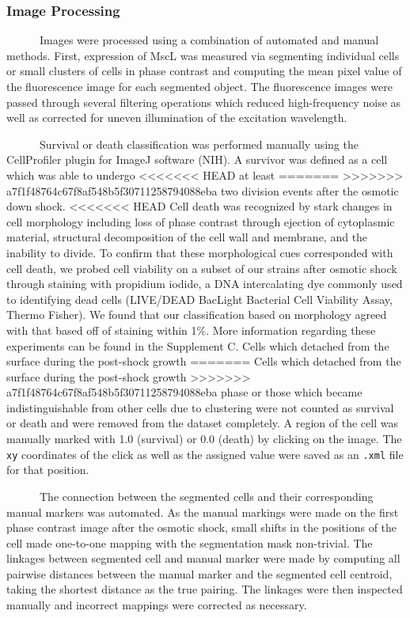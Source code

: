 \subsubsection{Image
Processing}\label{image-processing}

~ ~ ~
~Images
were
processed
using
a
combination
of
automated
and
manual
methods.
First,
expression
of
MscL
was
measured
via
segmenting
individual
cells
or
small
clusters
of
cells
in
phase
contrast
and
computing
the
mean
pixel
value
of the
fluorescence
image
for
each
segmented
object.
The
fluorescence
images
were
passed
through
several
filtering
operations
which
reduced
high-frequency
noise
as
well
as
corrected
for
uneven
illumination
of the
excitation
wavelength.

~ ~ ~
~Survival
or
death
classification
was
performed
manually
using
the
CellProfiler
plugin
for
ImageJ
software
(NIH).
A
survivor
was
defined
as a
cell
which
was
able
to
undergo
<<<<<<< HEAD
at
least
=======
>>>>>>> a7f1f48764c67f8af548b5f30711258794088eba
two
division
events
after
the
osmotic
down
shock.
<<<<<<< HEAD
Cell
death
was
recognized
by
stark
changes
in
cell
morphology
including
loss
of
phase
contrast
through
ejection
of
cytoplasmic
material,
structural
decomposition
of the
cell
wall
and
membrane,
and
the
inability
to
divide.
To
confirm
that
these
morphological
cues
corresponded
with
cell
death,
we
probed
cell
viability
on a
subset
of our
strains
after
osmotic
shock
through
staining
with
propidium
iodide,
a DNA
intercalating
dye
commonly
used
to
identifying
dead
cells
(LIVE/DEAD
BacLight
Bacterial
Cell
Viability
Assay,
Thermo
Fisher).
We
found
that
our
classification
based
on
morphology
agreed
with
that
based
off of
staining
within
1\%.
More
information
regarding
these
experiments
can be
found
in the
Supplement
C.
Cells
which
detached
from
the
surface
during
the
post-shock
growth
=======
Cells
which
detached
from
the
surface
during
the
post-shock
growth
>>>>>>> a7f1f48764c67f8af548b5f30711258794088eba
phase
or
those
which
became
indistinguishable
from
other
cells
due to
clustering
were
not
counted
as
survival
or
death
and
were
removed
from
the
dataset
completely.
A
region
of the
cell
was
manually
marked
with
1.0
(survival)
or 0.0
(death)
by
clicking
on the
image.
The
\texttt{xy}
coordinates
of the
click
as
well
as the
assigned
value
were
saved
as an
\texttt{.xml}
file
for
that
position.

~ ~ ~
~The
connection
between
the
segmented
cells
and
their
corresponding
manual
markers
was
automated.
As the
manual
markings
were
made
on the
first
phase
contrast
image
after
the
osmotic
shock,
small
shifts
in the
positions
of the
cell
made
one-to-one
mapping
with
the
segmentation
mask
non-trivial.
The
linkages
between
segmented
cell
and
manual
marker
were
made
by
computing
all
pairwise
distances
between
the
manual
marker
and
the
segmented
cell
centroid,
taking
the
shortest
distance
as the
true
pairing.
The
linkages
were
then
inspected
manually
and
incorrect
mappings
were
corrected
as
necessary.

